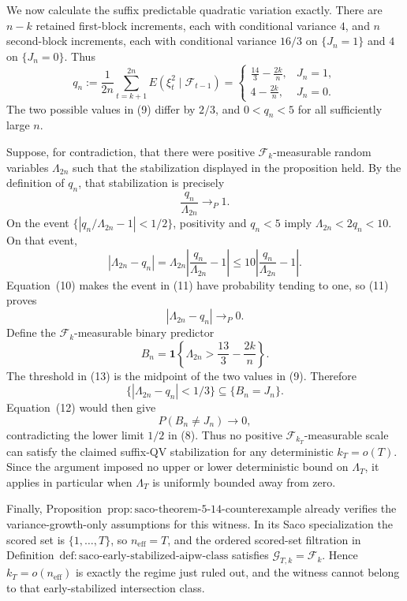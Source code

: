 We now calculate the suffix predictable quadratic variation exactly.  There are \(n-k\) retained first-block increments, each with conditional variance \(4\), and \(n\) second-block increments, each with conditional variance \(16/3\) on \(\{J_n=1\}\) and \(4\) on \(\{J_n=0\}\).  Thus
\[
 q_n:=\frac1{2n}\sum_{t=k+1}^{2n}
 E(\xi_t^2\mid\mathcal F_{t-1})
 =
 \begin{cases}
 \displaystyle\frac{14}{3}-\frac{2k}{n},&J_n=1,\\[5pt]
 \displaystyle4-\frac{2k}{n},&J_n=0.
 \end{cases}
\tag{9}
\]
The two possible values in (9) differ by \(2/3\), and \(0<q_n<5\) for all sufficiently large \(n\).

Suppose, for contradiction, that there were positive \(\mathcal F_k\)-measurable random variables \(\Lambda_{2n}\) such that the stabilization displayed in the proposition held.  By the definition of \(q_n\), that stabilization is precisely
\[
 \frac{q_n}{\Lambda_{2n}}\longrightarrow_P1.
\tag{10}
\]
On the event \(\{|q_n/\Lambda_{2n}-1|<1/2\}\), positivity and \(q_n<5\) imply \(\Lambda_{2n}<2q_n<10\).  On that event,
\[
 |\Lambda_{2n}-q_n|
 =\Lambda_{2n}\left|\frac{q_n}{\Lambda_{2n}}-1\right|
 \le10\left|\frac{q_n}{\Lambda_{2n}}-1\right|.
\tag{11}
\]
Equation~(10) makes the event in (11) have probability tending to one, so (11) proves
\[
 |\Lambda_{2n}-q_n|\longrightarrow_P0.
\tag{12}
\]
Define the \(\mathcal F_k\)-measurable binary predictor
\[
 B_n=\mathbf1\left\{\Lambda_{2n}>
 \frac{13}{3}-\frac{2k}{n}\right\}.
\tag{13}
\]
The threshold in (13) is the midpoint of the two values in (9).  Therefore
\[
 \{|\Lambda_{2n}-q_n|<1/3\}\subseteq\{B_n=J_n\}.
\]
Equation~(12) would then give
\[
 P(B_n\ne J_n)\longrightarrow0,
\tag{14}
\]
contradicting the lower limit \(1/2\) in (8).  Thus no positive \(\mathcal F_{k_T}\)-measurable scale can satisfy the claimed suffix-QV stabilization for any deterministic \(k_T=o(T)\).  Since the argument imposed no upper or lower deterministic bound on \(\Lambda_T\), it applies in particular when \(\Lambda_T\) is uniformly bounded away from zero.

Finally, Proposition~\(\mathrm{prop:saco\text{-}theorem\text{-}5\text{-}14\text{-}counterexample}\) already verifies the variance-growth-only assumptions for this witness.  In its Saco specialization the scored set is \(\{1,\ldots,T\}\), so \(n_{\mathrm{eff}}=T\), and the ordered scored-set filtration in Definition~\(\mathrm{def:saco\text{-}early\text{-}stabilized\text{-}aipw\text{-}class}\) satisfies \(\mathcal G_{T,k}=\mathcal F_k\).  Hence \(k_T=o(n_{\mathrm{eff}})\) is exactly the regime just ruled out, and the witness cannot belong to that early-stabilized intersection class.